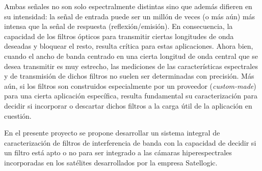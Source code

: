 \documentclass{ctuthesis}
\begin{document}
Ambas señales no son solo espectralmente distintas sino que además difieren en 
su intensidad: la señal de entrada puede ser un millón de veces (o más aún) más 
intensa que la señal de respuesta (reflexión/emisión). En consecuencia, la 
capacidad de los filtros ópticos para transmitir ciertas longitudes de onda 
deseadas y bloquear el resto, resulta crítica para estas aplicaciones. Ahora 
bien, cuando el ancho de banda centrado en una cierta longitud de onda central 
que se desea transmitir es muy estrecho, las mediciones de las características 
espectrales y de transmisión de dichos filtros no suelen ser determinadas con 
precisión. Más aún, si los filtros son construidos especialmente por un 
proveedor (\textit{custom-made}) para una cierta aplicación específica, resulta 
fundamental su caracterización para decidir si incorporar o descartar dichos 
filtros a la carga útil de la aplicación en cuestión.

En el presente proyecto se propone desarrollar un sistema integral de 
caracterización de filtros de interferencia de banda con la capacidad de 
decidir si un filtro está apto o no para ser integrado a las cámaras 
hiperespectrales incorporadas en los satélites desarrollados por la empresa 
Satellogic.



\end{document}
